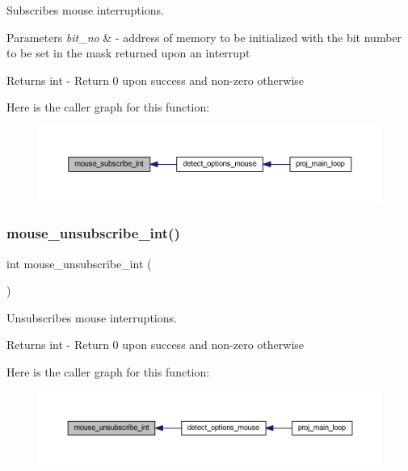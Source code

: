 Subscribes mouse interruptions. 


\begin{DoxyParams}{Parameters}
{\em bit\+\_\+no} & -\/ address of memory to be initialized with the bit number to be set in the mask returned upon an interrupt \\
\hline
\end{DoxyParams}
\begin{DoxyReturn}{Returns}
int -\/ Return 0 upon success and non-\/zero otherwise 
\end{DoxyReturn}
Here is the caller graph for this function\+:
\nopagebreak
\begin{figure}[H]
\begin{center}
\leavevmode
\includegraphics[width=350pt]{group__mouse_ga9da18257ff113b686bb826d154bfaa87_icgraph}
\end{center}
\end{figure}
\mbox{\label{group__mouse_ga685ad2706aca36d9869a30a19b9f446a}} 
\subsubsection{\texorpdfstring{mouse\+\_\+unsubscribe\+\_\+int()}{mouse\_unsubscribe\_int()}}
{\footnotesize\ttfamily int mouse\+\_\+unsubscribe\+\_\+int (\begin{DoxyParamCaption}{ }\end{DoxyParamCaption})}



Unsubscribes mouse interruptions. 

\begin{DoxyReturn}{Returns}
int -\/ Return 0 upon success and non-\/zero otherwise 
\end{DoxyReturn}
Here is the caller graph for this function\+:
\nopagebreak
\begin{figure}[H]
\begin{center}
\leavevmode
\includegraphics[width=350pt]{group__mouse_ga685ad2706aca36d9869a30a19b9f446a_icgraph}
\end{center}
\end{figure}
\mbox{\label{group__mouse_ga34f5d4446d7bc96bd4456ceab5d08ec9}} 
